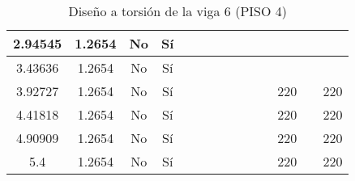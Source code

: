 \begin{table}[H]
{\begin{tabular}{|c|c|c|c|c|c|c|c|c|c|c|c|c|c|}
\hline
2.94545 & 1.2654 & No  & Sí  &     &     &     &     &     &     &     &     &     &  \bigstrut\\
\hline
3.43636 & 1.2654 & No  & Sí  &     &     &     &     &     &     &     &     &     &  \bigstrut\\
\hline
3.92727 & 1.2654 & No  & Sí  &     &     &     &     &     &     &     & 220 &     & 220 \bigstrut\\
\hline
4.41818 & 1.2654 & No  & Sí  &     &     &     &     &     &     &     & 220 &     & 220 \bigstrut\\
\hline
4.90909 & 1.2654 & No  & Sí  &     &     &     &     &     &     &     & 220 &     & 220 \bigstrut\\
\hline
5.4 & 1.2654 & No  & Sí  &     &     &     &     &     &     &     & 220 &     & 220 \bigstrut\\
\hline
\end{tabular}%

  


  }
      \caption{Diseño a torsión de la viga 6 (PISO 4) }
  \label{tab:T VG6 P4 }%
\end{table}%

